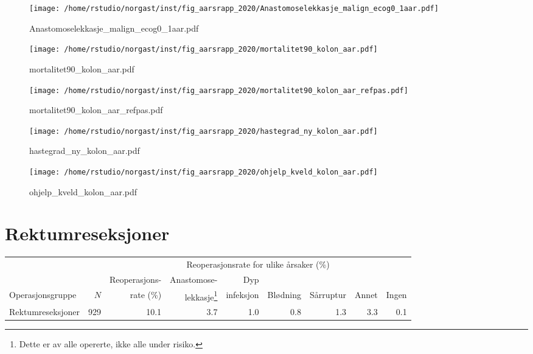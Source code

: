 \documentclass[norsk,a4paper]{article}\usepackage[]{graphicx}\usepackage[]{color}
\makeatletter
\newenvironment{kframe}{%
 \def\at@end@of@kframe{}%
 \ifinner\ifhmode%
  \def\at@end@of@kframe{\end{minipage}}%
  \begin{minipage}{\columnwidth}%
 \fi\fi%
 \def\FrameCommand##1{\hskip\@totalleftmargin \hskip-\fboxsep
 \colorbox{shadecolor}{##1}\hskip-\fboxsep
     \hskip-\linewidth \hskip-\@totalleftmargin \hskip\columnwidth}%
 \MakeFramed {\advance\hsize-\width
   \@totalleftmargin\z@ \linewidth\hsize
   \@setminipage}}%
 {\par\unskip\endMakeFramed%
 \at@end@of@kframe}
\makeatother
\begin{document}
\begin{figure}[ht]
\centering
\texttt{[image: /home/rstudio/norgast/inst/fig\_aarsrapp\_2020/Anastomoselekkasje\_malign\_ecog0\_1aar.pdf]}
\caption{Anastomoselekkasje\_malign\_ecog0\_1aar.pdf}
\end{figure}

\begin{figure}[ht]
\centering
\texttt{[image: /home/rstudio/norgast/inst/fig\_aarsrapp\_2020/mortalitet90\_kolon\_aar.pdf]}
\caption{mortalitet90\_kolon\_aar.pdf}
\end{figure}

\begin{figure}[ht]
\centering
\texttt{[image: /home/rstudio/norgast/inst/fig\_aarsrapp\_2020/mortalitet90\_kolon\_aar\_refpas.pdf]}
\caption{mortalitet90\_kolon\_aar\_refpas.pdf}
\end{figure}

\begin{figure}[ht]
\centering
\texttt{[image: /home/rstudio/norgast/inst/fig\_aarsrapp\_2020/hastegrad\_ny\_kolon\_aar.pdf]}
\caption{hastegrad\_ny\_kolon\_aar.pdf}
\end{figure}

\begin{figure}[ht]
\centering
\texttt{[image: /home/rstudio/norgast/inst/fig\_aarsrapp\_2020/ohjelp\_kveld\_kolon\_aar.pdf]}
\caption{ohjelp\_kveld\_kolon\_aar.pdf}
\end{figure}

\clearpage

\section{Rektumreseksjoner}

\begin{table}[htb]
\begin{minipage}{\textwidth}
\centering
\begin{kframe}


{\ttfamily\noindent\bfseries{}}\end{kframe}%
\begin{tabular}{lrrrrrrrr}
  \toprule
  & & & \multicolumn{4}{c}{Reoperasjonsrate for ulike årsaker (\%)} \\
 \cline{4-9} 
 & & Reoperasjons- & Anastomose- & Dyp &&&&  \\
 Operasjonsgruppe & $N$ & rate (\%) & lekkasje\footnote[2]{Dette er av alle opererte, ikke
alle under risiko.} & infeksjon & Blødning & Sårruptur & Annet & Ingen \\
 \midrule
Rektumreseksjoner & 929 & 10.1 & 3.7 & 1.0 & 0.8 & 1.3 & 3.3 & 0.1 \\ 
   \bottomrule
\end{tabular}

\end{minipage}
\end{table}
\end{document}
